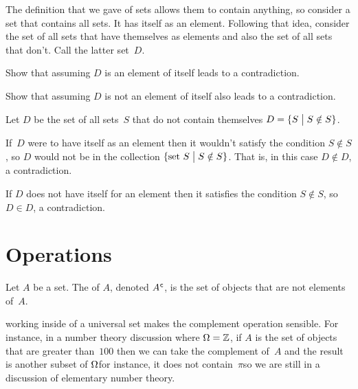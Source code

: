 \documentclass{ibl}  %
\begin{document}
\begin{ex} 
The definition that we gave of sets allows them to contain anything, so 
consider a set that contains all sets.
It has itself as an element.
Following that idea, 
consider the set of all sets that have themselves as elements and  
also the set of all sets that don't.
Call the latter set~$D$.
\begin{exes}
\item Show that assuming $D$ is an element of itself leads to a contradiction.
\item Show that assuming $D$ is not an element of itself also leads to a
contradiction.  
\end{exes}
\begin{ans}
Let $D$ be the set of all sets~$S$ that do not contain themselves
$D=\{S \bigm| S\notin S\}$.
\begin{exes}
\item If~$D$ were to have itself as an element 
  then it wouldn't satisfy the condition
  $S\notin S$, so $D$ would not be in the collection 
  $\{\text{set~$S$} \bigm| S\notin S\}$.
  That is, in this case $D\notin D$, a contradiction. 
\item If $D$ does not have itself for an element then it satisfies the
  condition $S\notin S$, so $D\in D$, a contradiction.
\end{exes}
\end{ans}
\end{ex}






\section{Operations}

\begin{df}
Let $A$ be a set.
The  of $A$, denoted ${A}^{\mspace{1mu}\mathsf{c}}$, is the 
set of objects that are not elements of~$A$.  
\end{df}

\noindent\remark
working inside of a universal set makes the complement
operation sensible. 
For instance, in a number theory discussion where $\Omega=\mathbb{Z}$, 
if $A$ is the set of objects that are greater than~$100$ then we can
take the complement of~$A$ and the result is another subset of 
$\Omega$\Dash for instance, it does not contain~$\pi$\Dash so 
we are still in a discussion of elementary number theory.
\end{document}
